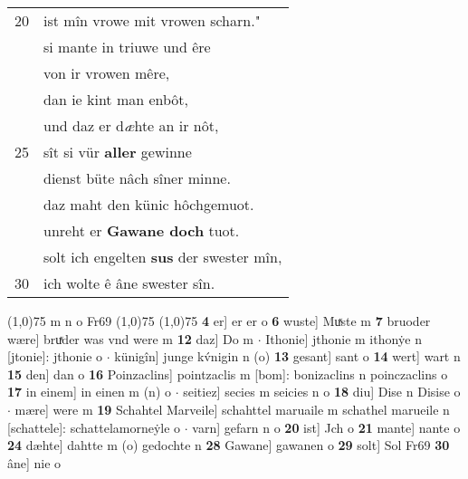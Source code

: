 \documentclass[8pt,a4paper,notitlepage]{article}
\begin{document}
\begin{table}[ht]
\begin{minipage}[t]{0.5\linewidth}
\begin{tabular}{rl}
20 & ist mîn vrowe mit vrowen scharn."\\ 
 & si mante in triuwe und êre\\ 
 & von ir vrowen mêre,\\ 
 & dan ie kint man enbôt,\\ 
 & und daz er d\textit{æ}hte an ir nôt,\\ 
25 & sît si vür \textbf{aller} gewinne\\ 
 & dienst büte nâch sîner minne.\\ 
 & daz maht den künic hôchgemuot.\\ 
 & unreht er \textbf{Gawane doch} tuot.\\ 
 & solt ich engelten \textbf{sus} der swester mîn,\\ 
30 & ich wolte ê âne swester sîn.\\ 
\end{tabular}
\scriptsize
\line(1,0){75} \newline
m n o Fr69 \newline
\line(1,0){75} \newline
\newline
\line(1,0){75} \newline
\textbf{4} er] er er o \textbf{6} wuste] Muͯste m \textbf{7} bruoder wære] bruͯder was vnd were m \textbf{12} daz] Do m  $\cdot$ Ithonie] jthonie m ithonẏe n [jtonie]: jthonie o  $\cdot$ künigîn] junge kv́nigin n (o) \textbf{13} gesant] sant o \textbf{14} wert] wart n \textbf{15} den] dan o \textbf{16} Poinzaclins] pointzaclis m [bom]: bonizaclins n poinczaclins o \textbf{17} in einem] in einen m (n) o  $\cdot$ seitiez] secies m seicies n o \textbf{18} diu] Dise n Disise o  $\cdot$ mære] were m \textbf{19} Schahtel Marveile] schahttel maruaile m schathel marueile n [schattele]: schattelamorneẏle o  $\cdot$ varn] gefarn n o \textbf{20} ist] Jch o \textbf{21} mante] nante o \textbf{24} dæhte] dahtte m (o) gedochte n \textbf{28} Gawane] gawanen o \textbf{29} solt] Sol Fr69 \textbf{30} âne] nie o \newline
\end{minipage}
\end{table}
\newpage
\end{document}
